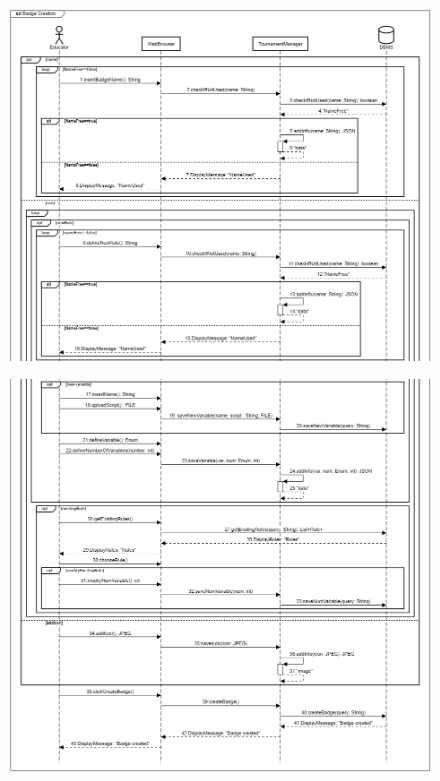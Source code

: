 \documentclass[12pt,oneside,a4paper]{article}
\begin{document}
\begin{figure}[htbp]
    \centering
    \includegraphics[width=1\linewidth]{Images/Sequence Diagrams/BadgeCreation1.png}
    \label{fig:enter-label}
\end{figure}

\begin{figure}[htbp]
    \centering
    \includegraphics[width=1\linewidth]{Images/Sequence Diagrams/BadgeCreation2.png}
    \label{fig:enter-label}
\end{figure}
\end{document}
